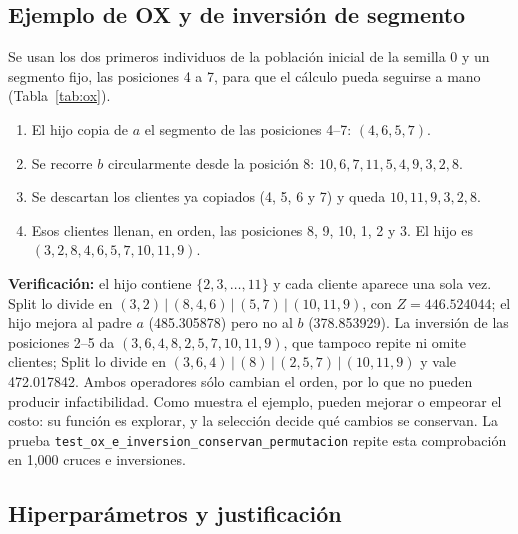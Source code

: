 \documentclass[11pt,a4paper]{article}
\numberwithin{equation}{section}
\begin{document}
\subsection{Ejemplo de OX y de inversión de segmento}\label{sec:ejox}

Se usan los dos primeros individuos de la población inicial de la semilla 0 y un segmento fijo, las posiciones 4 a 7, para que el cálculo pueda seguirse a mano (Tabla~\ref{tab:ox}).

\begin{table}[H]\centering\small
\caption{Cruza OX entre \(a\) y \(b\) con segmento en las posiciones 4--7, seguida de la inversión de las posiciones 2--5. En negritas, los genes copiados o invertidos.}\label{tab:ox}

\end{table}

\begin{enumerate}
\item El hijo copia de \(a\) el segmento de las posiciones 4--7: \((4,6,5,7)\).
\item Se recorre \(b\) circularmente desde la posición 8: \(10,6,7,11,5,4,9,3,2,8\).
\item Se descartan los clientes ya copiados (4, 5, 6 y 7) y queda \(10,11,9,3,2,8\).
\item Esos clientes llenan, en orden, las posiciones 8, 9, 10, 1, 2 y 3. El hijo es \((3,2,8,4,6,5,7,10,11,9)\).
\end{enumerate}

\textbf{Verificación:} el hijo contiene \(\{2,3,\dots,11\}\) y cada cliente aparece una sola vez. Split lo divide en \((3,2)\,|\,(8,4,6)\,|\,(5,7)\,|\,(10,11,9)\), con \(Z=446.524044\); el hijo mejora al padre \(a\) (485.305878) pero no al \(b\) (378.853929). La inversión de las posiciones 2--5 da \((3,6,4,8,2,5,7,10,11,9)\), que tampoco repite ni omite clientes; Split lo divide en \((3,6,4)\,|\,(8)\,|\,(2,5,7)\,|\,(10,11,9)\) y vale 472.017842. Ambos operadores sólo cambian el orden, por lo que no pueden producir infactibilidad. Como muestra el ejemplo, pueden mejorar o empeorar el costo: su función es explorar, y la selección decide qué cambios se conservan. La prueba \texttt{test\_ox\_e\_inversion\_conservan\_permutacion} repite esta comprobación en 1,000 cruces e inversiones.

\subsection{Hiperparámetros y justificación}
\end{document}
